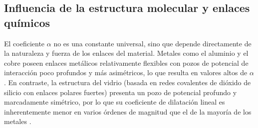 \subsection{Influencia de la estructura molecular y enlaces químicos}

El coeficiente $\alpha$ no es una constante universal, sino que depende directamente de la naturaleza y fuerza de los enlaces del material. Metales como el aluminio y el cobre poseen enlaces metálicos relativamente flexibles con pozos de potencial de interacción poco profundos y más asimétricos, lo que resulta en valores altos de $\alpha$. En contraste, la estructura del vidrio (basada en redes covalentes de dióxido de silicio con enlaces polares fuertes) presenta un pozo de potencial profundo y marcadamente simétrico, por lo que su coeficiente de dilatación lineal es inherentemente menor en varios órdenes de magnitud que el de la mayoría de los metales \cite{serway}.